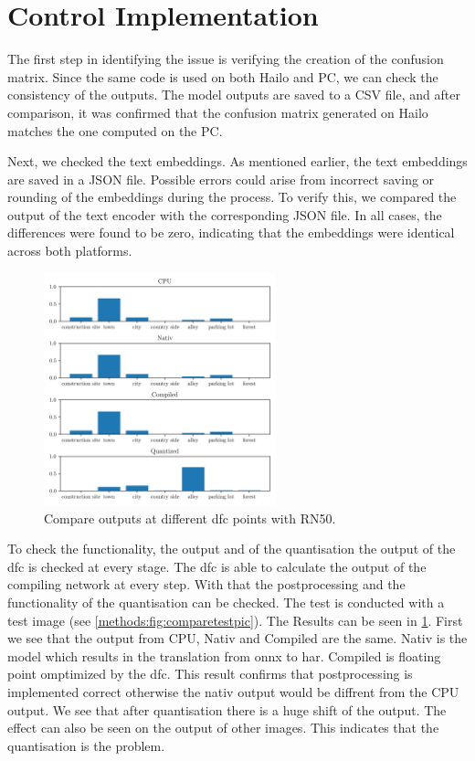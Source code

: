 \section{Control Implementation
    \label{scetion:methods:contimp}}

The first step in identifying the issue is verifying the creation of the confusion matrix.
Since the same code is used on both Hailo and PC, we can check the consistency of the outputs.
The model outputs are saved to a CSV file, and after comparison, it was confirmed that the confusion matrix generated on Hailo matches the one computed on the PC.

Next, we checked the text embeddings.
As mentioned earlier, the text embeddings are saved in a JSON file.
Possible errors could arise from incorrect saving or rounding of the embeddings during the process.
To verify this, we compared the output of the text encoder with the corresponding JSON file.
In all cases, the differences were found to be zero, indicating that the embeddings were identical across both platforms.

\begin{figure}[h]
    \centering
    \includegraphics[width=0.6\textwidth]{Images/Implementation/compareProbs_RN50.png}
    \caption{Compare outputs at different \acrshort{dfc} points with RN50.}
    \label{methods:fig:comparern50}
\end{figure}

To check the functionality, the output and of the quantisation the output of the \acrshort{dfc} is checked at every stage.
The \acrshort{dfc} is able to calculate the output of the compiling network at every step.
With that the postprocessing and the functionality of the quantisation can be checked.
The test is conducted with a test image (see \cref{methods:fig:comparetestpic}).
The Results can be seen in \cref{methods:fig:comparern50}.
First we see that the output from CPU, Nativ and Compiled are the same.
Nativ is the model which results in the translation from onnx to \acrshort{har}.
Compiled is floating point omptimized by the \acrshort{dfc}.
This result confirms that postprocessing is implemented correct otherwise the nativ output would be diffrent from the CPU output.
We see that after quantisation there is a huge shift of the output.
The effect can also be seen on the output of other images.
This indicates that the quantisation is the problem.


